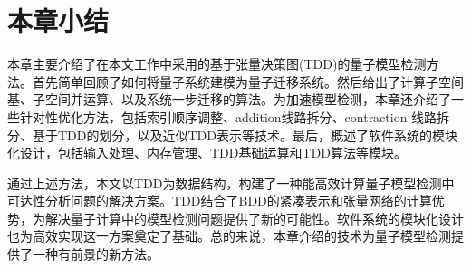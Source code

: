 \section{本章小结}
本章主要介绍了在本文工作中采用的基于张量决策图(TDD)的量子模型检测方法。首先简单回顾了如何将量子系统建模为量子迁移系统。然后给出了计算子空间基、子空间并运算、以及系统一步迁移的算法。为加速模型检测，本章还介绍了一些针对性优化方法，包括索引顺序调整、addition线路拆分、contraction 线路拆分、基于TDD的划分，以及近似TDD表示等技术。最后，概述了软件系统的模块化设计，包括输入处理、内存管理、TDD基础运算和TDD算法等模块。

通过上述方法，本文以TDD为数据结构，构建了一种能高效计算量子模型检测中可达性分析问题的解决方案。TDD结合了BDD的紧凑表示和张量网络的计算优势，为解决量子计算中的模型检测问题提供了新的可能性。软件系统的模块化设计也为高效实现这一方案奠定了基础。总的来说，本章介绍的技术为量子模型检测提供了一种有前景的新方法。
